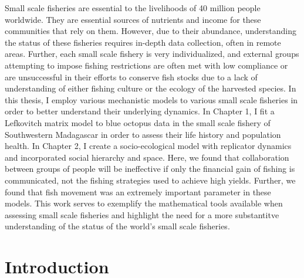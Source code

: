 \documentclass[
]{article}
\begin{document}
Small scale fisheries are essential to the livelihoods of 40 million people worldwide. They are essential sources of nutrients and income for these communities that rely on them. However, due to their abundance, understanding the status of these fisheries requires in-depth data collection, often in remote areas. Further, each small scale fishery is very individualized, and external groups attempting to impose fishing restrictions are often met with low compliance or are unsuccessful in their efforts to conserve fish stocks due to a lack of understanding of either fishing culture or the ecology of the harvested species. In this thesis, I employ various mechanistic models to various small scale fisheries in order to better understand their underlying dynamics. In Chapter 1, I fit a Lefkovitch matrix model to blue octopus data in the small scale fishery of Southwestern Madagascar in order to assess their life history and population health. In Chapter 2, I create a socio-ecological model with replicator dynamics and incorporated social hierarchy and space. Here, we found that collaboration between groups of people will be ineffective if only the financial gain of fishing is communicated, not the fishing strategies used to achieve high yields. Further, we found that fish movement was an extremely important parameter in these models. This work serves to exemplify the mathematical tools available when assessing small scale fisheries and highlight the need for a more substantitve understanding of the status of the world's small scale fisheries.

\newpage


\hypertarget{introduction}{%
\section{Introduction}\label{introduction}}
\end{document}
